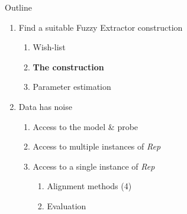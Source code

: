 \documentclass{beamer}
\def\fe{Fuzzy Extractor\xspace}
\newcommand{\rep}{\textit{Rep}\xspace}
\begin{document}
\begin{frame}{Outline}
   \begin{enumerate}
   \item Find a suitable \fe construction
\begin{enumerate}
    \item Wish-list
    \item \textbf{The construction}
    \item Parameter estimation\\
\end{enumerate}
   \item Data has noise
   \begin{enumerate}
       \item Access to the model \& probe
       \item Access to multiple instances of \rep
       \item Access to a single instance of \rep
        \begin{enumerate}
            \item Alignment methods (4)
            \item Evaluation
        \end{enumerate}
   \end{enumerate}    
\end{enumerate} 
\end{frame}
\end{document}
